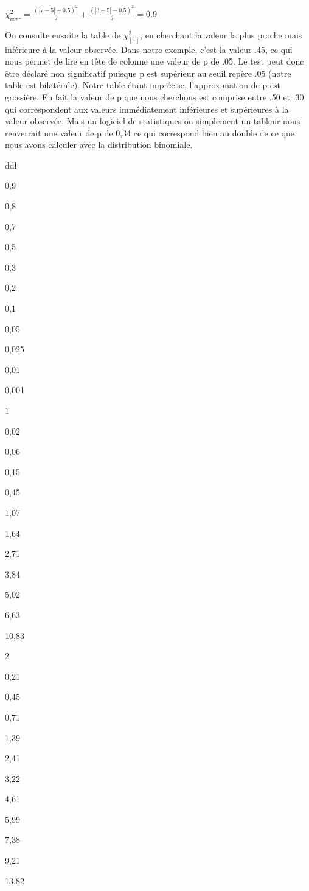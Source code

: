 \documentclass[]{book}
\theoremstyle{definition}
\theoremstyle{definition}
\theoremstyle{definition}
\theoremstyle{remark}
\begin{document}
\(\chi_{corr}^{2} = \frac{(\left | 7-5 \right |-0.5)^{2}}{5}+\frac{(\left | 3-5 \right |-0.5)^{2}}{5}=0.9\)

On consulte ensuite la table de \(\chi ^2_{[1]}\), en cherchant la
valeur la plus proche mais inférieure à la valeur observée. Dans notre
exemple, c'est la valeur .45, ce qui nous permet de lire en tête de
colonne une valeur de p de .05. Le test peut donc être déclaré non
significatif puisque p est supérieur au seuil repère .05 (notre table
est bilatérale). Notre table étant imprécise, l'approximation de p est
grossière. En fait la valeur de p que nous cherchons est comprise entre
.50 et .30 qui correspondent aux valeurs immédiatement inférieures et
supérieures à la valeur observée. Mais un logiciel de statistiques ou
simplement un tableur nous renverrait une valeur de p de 0,34 ce qui
correspond bien au double de ce que nous avons calculer avec la
distribution binomiale.

ddl

0,9

0,8

0,7

0,5

0,3

0,2

0,1

0,05

0,025

0,01

0,001

1

0,02

0,06

0,15

0,45

1,07

1,64

2,71

3,84

5,02

6,63

10,83

2

0,21

0,45

0,71

1,39

2,41

3,22

4,61

5,99

7,38

9,21

13,82
\end{document}
